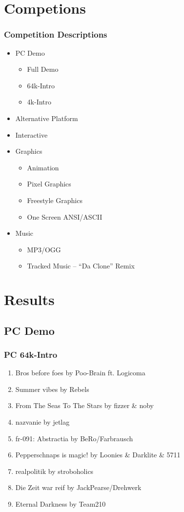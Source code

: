 \documentclass{beamer}
\begin{document}
\section{Competions}

\begin{frame}
  \frametitle{Competition Descriptions}
  \begin{itemize}
  \item PC Demo
    \begin{itemize}
    \item Full Demo
    \item 64k-Intro
    \item 4k-Intro
    \end{itemize}
  \item Alternative Platform
  \item Interactive
  \item Graphics
    \begin{itemize}
    \item Animation
    \item Pixel Graphics
    \item Freestyle Graphics
    \item One Screen ANSI/ASCII
    \end{itemize}
  \item Music
    \begin{itemize}
    \item MP3/OGG
    \item Tracked Music -- ``Da Clone'' Remix
    \end{itemize}
  \end{itemize}
\end{frame}



\section{Results}


\subsection{PC Demo}
\begin{frame}
  \frametitle{PC 64k-Intro}
  \begin{enumerate}
  \item Bros before foes by Poo-Brain ft. Logicoma
  \item Summer vibes by Rebels
  \item From The Seas To The Stars by fizzer \& noby
  \item nazvanie by jetlag
  \item fr-091: Abstractia by BeRo/Farbrausch
  \item Pepperschnaps is magic! by Loonies \& Darklite \& 5711
  \item realpolitik by stroboholics
  \item Die Zeit war reif by JackPearse/Drehwerk
  \item Eternal Darkness by Team210
  \end{enumerate}
\end{frame}
\end{document}

